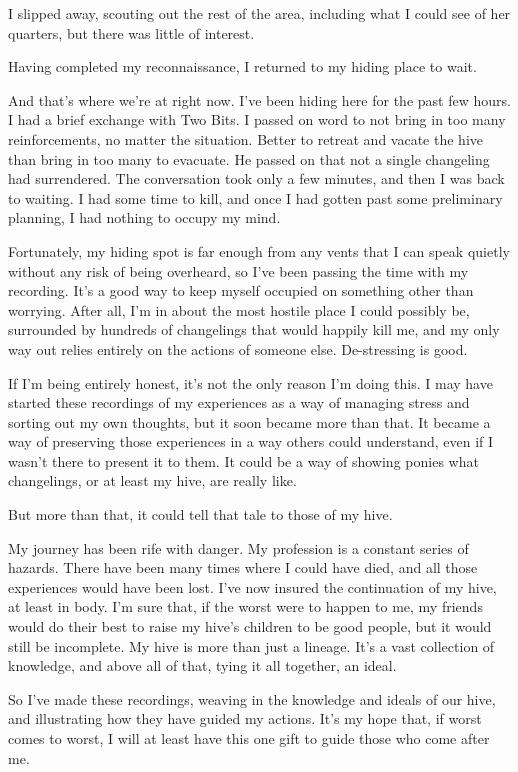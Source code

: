 I slipped away, scouting out the rest of the area, including what I could see of her quarters, but there was little of interest.

Having completed my reconnaissance, I returned to my hiding place to wait.

{\br}%
And that’s where we’re at right now. I’ve been hiding here for the past few hours. I had a brief exchange with Two Bits. I passed on word to not bring in too many reinforcements, no matter the situation. Better to retreat and vacate the hive than bring in too many to evacuate. He passed on that not a single changeling had surrendered. The conversation took only a few minutes, and then I was back to waiting. I had some time to kill, and once I had gotten past some preliminary planning, I had nothing to occupy my mind.

Fortunately, my hiding spot is far enough from any vents that I can speak quietly without any risk of being overheard, so I’ve been passing the time with my recording. It’s a good way to keep myself occupied on something other than worrying. After all, I’m in about the most hostile place I could possibly be, surrounded by hundreds of changelings that would happily kill me, and my only way out relies entirely on the actions of someone else. De-stressing is good.

If I’m being entirely honest, it’s not the only reason I’m doing this. I may have started these recordings of my experiences as a way of managing stress and sorting out my own thoughts, but it soon became more than that. It became a way of preserving those experiences in a way others could understand, even if I wasn’t there to present it to them. It could be a way of showing ponies what changelings, or at least my hive, are really like.

But more than that, it could tell that tale to those of my hive.

My journey has been rife with danger. My profession is a constant series of hazards. There have been many times where I could have died, and all those experiences would have been lost. I’ve now insured the continuation of my hive, at least in body. I’m sure that, if the worst were to happen to me, my friends would do their best to raise my hive’s children to be good people, but it would still be incomplete. My hive is more than just a lineage. It’s a vast collection of knowledge, and above all of that, tying it all together, an ideal.

So I’ve made these recordings, weaving in the knowledge and ideals of our hive, and illustrating how they have guided my actions. It’s my hope that, if worst comes to worst, I will at least have this one gift to guide those who come after me.

